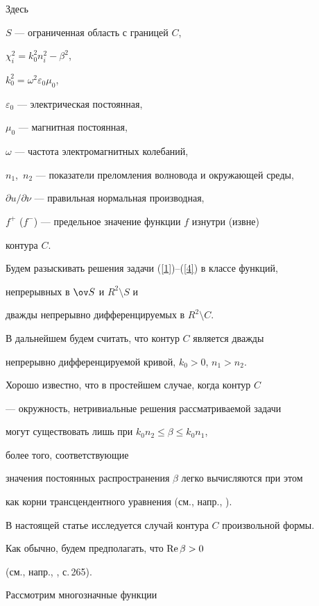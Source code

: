 Здесь 


$S$ --- ограниченная область с границей $C$,


$\chi_i^2 = k_0^2n_i^2 - \beta^2$, 


$k_0^2 = \omega^2 \varepsilon_0 \mu_0$,


$\varepsilon_0$ --- электрическая постоянная,


$\mu_0$ --- магнитная постоянная,


$\omega$ --- частота электромагнитных колебаний,


$n_1$,~$n_2$ --- показатели преломления волновода и окружающей среды,


$\partial u / \partial \nu$ --- правильная нормальная производная,


$f^+$ ($f^-$) --- предельное значение функции $f$ изнутри (извне) 


контура $ C $.





Будем разыскивать решения задачи (\ref{1})--(\ref{4}) в классе функций,


непрерывных в $\ov S$ и $R^2 \setminus S$ и


дважды непрерывно дифференцируемых в $R^2\setminus C$.


В дальнейшем будем считать, что контур $C$ является дважды


непрерывно дифференцируемой кривой, $k_0 > 0$, $n_1 > n_2$.





Хорошо известно, что в простейшем случае, когда контур $C$ 


--- окружность, нетривиальные решения рассматриваемой задачи 


могут существовать лишь при $k_0n_2 \le \beta \le k_0n_1$,


более того, соответствующие 


значения постоянных распространения $\beta$ легко вычисляются при этом


как корни трансцендентного уравнения (см., напр., \cite{199704150007}).


В настоящей статье исследуется случай контура $C$ произвольной формы. 





Как обычно, будем предполагать, что $\operatorname{Re} \beta > 0$


(см., напр., \cite{209703130006}, с.\,265).


Рассмотрим многозначные функции


